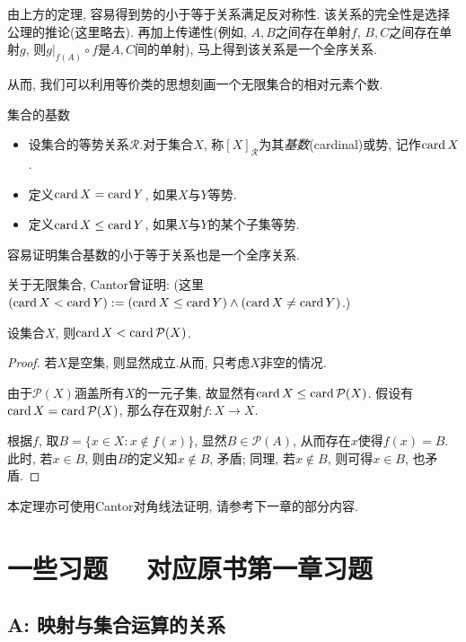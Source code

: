 由上方的定理, 容易得到势的小于等于关系满足反对称性. 该关系的完全性是选择公理的推论(这里略去). 再加上传递性(例如, $A, B$之间存在单射$f$, $B, C$之间存在单射$g$, 则$g|_{f(A)} \circ f$是$A, C$间的单射), 马上得到该关系是一个全序关系. 

从而, 我们可以利用等价类的思想刻画一个无限集合的相对元素个数.

\begin{definition}{集合的基数}
	\vspace{-2em}
	\begin{itemize}
		\item 设集合的等势关系$\mathcal{R}$.对于集合$X$, 称$[X]_{\mathcal{R}}$为其\textit{基数}(cardinal)或势, 记作$\operatorname{card} X$.
		\item 定义$\operatorname{card} X = \operatorname{card} Y$, 如果$X$与$Y$等势.
		\item 定义$\operatorname{card} X \leq \operatorname{card} Y$, 如果$X$与$Y$的某个子集等势.
	\end{itemize}
\end{definition}

容易证明集合基数的小于等于关系也是一个全序关系.

关于无限集合, Cantor曾证明: (这里$(\operatorname{card} X < \operatorname{card} Y): = (\operatorname{card} X \leq \operatorname{card} Y) \wedge (\operatorname{card} X \neq \operatorname{card} Y)$.)

\begin{theorem}{}
	设集合$X$, 则$\operatorname{card} X < \operatorname{card} \mathcal{P}(X)$.
\end{theorem}
\begin{proof}
	若$X$是空集, 则显然成立.从而, 只考虑$X$非空的情况. 
	
	由于$\mathcal{P}(X)$涵盖所有$X$的一元子集, 故显然有$\operatorname{card} X \leq \operatorname{card} \mathcal{P}(X)$. 假设有$\operatorname{card} X = \operatorname{card} \mathcal{P}(X)$, 那么存在双射$f: X \to X$. 
	
	根据$f$, 取$B=\{ x \in X: x \notin f(x) \}$, 显然$B \in \mathcal{P}(A)$, 从而存在$x$使得$f(x)=B$. 此时, 若$x \in B$, 则由$B$的定义知$x \notin B$, 矛盾; 同理, 若$x \notin B$, 则可得$x \in B$, 也矛盾. 
\end{proof}
\begin{remark}
	本定理亦可使用Cantor对角线法证明, 请参考下一章的部分内容. 
\end{remark}

\newpage
\section*{一些习题 ~~\small 对应原书第一章习题} \label{sec:ex1.1}

\subsection*{A: 映射与集合运算的关系}

